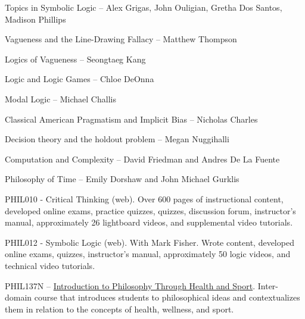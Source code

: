 \documentclass[p1noheader, 11pt, springgreenmode]{lightcv}
\begin{document}
\begin{rlist} 
\item Topics in Symbolic Logic -- Alex Grigas, John Ouligian, Gretha Dos Santos, Madison Phillips
\item Vagueness and the Line-Drawing Fallacy -- Matthew Thompson
\item Logics of Vagueness -- Seongtaeg Kang
\item Logic and Logic Games -- Chloe DeOnna
\item Modal Logic -- Michael Challis
\item Classical American Pragmatism and Implicit Bias -- Nicholas Charles
\item Decision theory and the holdout problem -- Megan Nuggihalli
\item Computation and Complexity -- David Friedman and Andres De La Fuente
\item Philosophy of Time -- Emily Dorshaw and John Michael Gurklis
\end{rlist}

\begin{rlist}    
    \item PHIL010 - Critical Thinking (web). Over 600 pages of instructional content, developed online exams, practice quizzes, quizzes, discussion forum, instructor’s manual, approximately
    26 lightboard videos, and supplemental video tutorials.
    \item PHIL012 - Symbolic Logic (web). With Mark Fisher. Wrote content, developed online exams, quizzes, instructor’s manual, approximately 50 logic videos, and technical video tutorials.
    \item PHIL137N – \href{https://bulletins.psu.edu/university-course-descriptions/undergraduate/phil/}{Introduction to Philosophy Through Health and Sport}. Inter-domain course that introduces students to philosophical ideas and contextualizes them in relation to the concepts of health, wellness, and sport.
\end{rlist}
\end{document}
